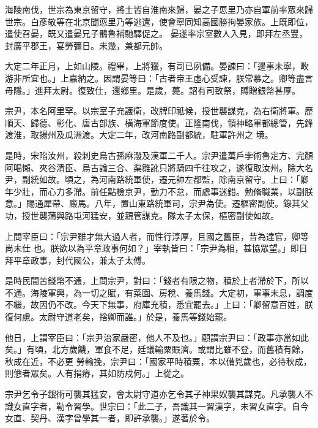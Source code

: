 \begin{pinyinscope}
 海陵南伐，世宗為東京留守，將士皆自淮南來歸，晏之子恧里乃亦自軍前率眾來歸世宗。白彥敬等在北京聞恧里乃等逃還，使會寧同知高國勝拘晏家族。上既即位，遣使召晏，既又遣晏兄子鶻魯補馳驛促之。
 晏遂率宗室數人入見，即拜左丞豐，封廣平郡王，宴勞彌日。未幾，兼都元帥。



 大定二年正月，上如山陵。禮畢，上將獵，有司已夙備。晏諫曰：「邊事未寧，畋游非所宜也。」上嘉納之。因謂晏等曰：「古者帝王虛心受諫，朕常慕之。卿等盡言毋隱。」進拜太尉。復致仕，還鄉里。是歲，薨。詔有司致祭，賻贈銀幣甚厚。



 宗尹，本名阿里罕。以宗室子充護衛，改牌印祗候，授世襲謀克，為右衛將軍。歷順天、歸德、彰化、唐古部族、橫海軍節度使。正隆南伐，領神略軍都總管，先鋒渡淮，取揚州及瓜洲渡。大定二年，改河南路副都統，駐軍許州之
 境。



 是時，宋陷汝州，殺刺史烏古孫麻潑及漢軍二千人。宗尹遣萬戶孛術魯定方、完顏阿喝懶、夾谷清臣、烏古論三合、渠雛訛只將騎四千往攻之，遂復取汝州。除大名尹，副統如故。頃之，為河南路統軍使，遷元帥左都監，除南京留守。上曰：「卿年少壯，而心力多滯。前任點檢京尹，勤力不怠，而處事迷錯。勉脩職業，以副朕意。」賜通犀帶、廄馬。八年，置山東路統軍司，宗尹為使。遷樞密副使。錄其父功，授世襲蒲與路屯河猛安，並親管謀克。隊太子太保，樞密副使如故。



 上問宰臣曰：「宗尹雖才無大過人者，而性行淳厚，且國之舊臣，昔為達官，卿等尚未仕
 也。朕欲以為平章政事何如？」宰執皆曰：「宗尹為相，甚協眾望。」即日拜平章政事，封代國公，兼太子太傅。



 是時民間苦錢幣不通，上問宗尹，對曰：「錢者有限之物，積於上者滯於下，所以不通。海陵軍興，為一切之賦，有菜園、房稅、養馬錢。大定初，軍事未息，調度不繼，故因仍不改。今天下無事，府庫充積，悉宜罷去。」上曰：「卿留意百姓，朕復何慮。太尉守道老矣，捨卿而誰。」於是，養馬等錢始罷。



 他日，上謂宰臣曰：「宗尹治家嚴密，他人不及也。」顧謂宗尹曰：「政事亦當如此矣。」有頃，北方歲饑，軍食不足，廷議輸粟賑濟。或謂比雖不登，而舊積有餘，秋成在近，不必更
 勞輸挽，宗尹曰：「國家平時積粟，本以備兇歲也，必待秋成，則憊者眾矣。人有捐瘠，其如防戍何。」上從之。



 宗尹乞令子銀術可襲其猛安，會太尉守道亦乞令其子神果奴襲其謀克。凡承襲人不識女直字者，勒令習學。世宗曰：「此二子，吾識其一習漢字，未習女直字。自今女直、契丹、漢字曾學其一者，即許承襲。」遂著於令。




\end{pinyinscope}
